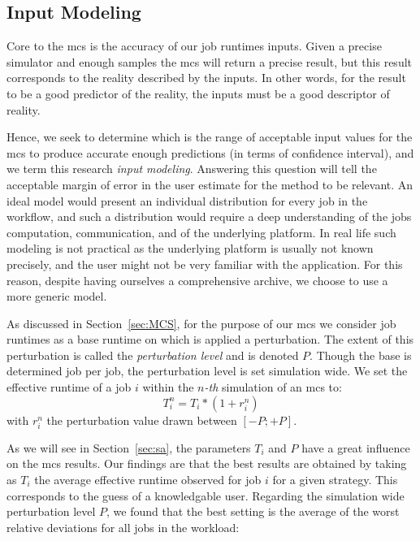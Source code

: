 \documentclass[10pt,conference,compsocconf]{IEEEtran}
\begin{document}
\subsection{Input Modeling}\label{sec:im}

Core  to the  \acl{mcs} is  the accuracy  of our  job runtimes  inputs. Given  a
precise simulator and enough samples the  \ac{mcs} will return a precise result,
but this  result corresponds to  the reality described  by the inputs.  In other
words, for the result to be a good  predictor of the reality, the inputs must be
a good descriptor of reality.

Hence, we seek  to determine which is  the range of acceptable  input values for
the  \ac{mcs} to  produce accurate  enough predictions  (in terms  of confidence
interval),  and we  term this  research \emph{input  modeling}.  Answering  this
question will tell the  acceptable margin of error in the  user estimate for the
method to be relevant.
An ideal  model would present  an individual distribution  for every job  in the
workflow, and such a distribution would require a deep understanding of the jobs
computation, communication, and  of the underlying platform.  In  real life such
modeling  is not  practical  as the  underlying platform  is  usually not  known
precisely, and  the user might  not be very  familiar with the  application. For
this reason, despite having ourselves a  comprehensive archive, we choose to use
a more generic model.

As discussed in Section~\ref{sec:MCS}, for the purpose of our \ac{mcs} we
consider job runtimes as a base runtime on which is applied a perturbation.  The
extent of this perturbation is called the \emph{perturbation level} and is
denoted $P$. Though the base is determined job per job, the perturbation level
is set simulation wide. We set the effective runtime of a job $i$ within the
$n$\textit{-th} simulation of an \ac{mcs} to: \[T_i^n = T_i * (1+r_i^n)\] with
$r_i^n$ the perturbation value drawn between $[-P;+P]$.

As we  will see  in Section~\ref{sec:sa},  the parameters $T_i$  and $P$  have a
great influence on the \ac{mcs} results.  Our findings are that the best results
are obtained by  taking as $T_i$ the average effective  runtime observed for job
$i$ for a given  strategy. This corresponds to the guess of a knowledgable user.
Regarding  the simulation  wide perturbation level  $P$, we found  that the best
setting  is the average  of the worst relative deviations for all jobs in the
workload:
\end{document}
